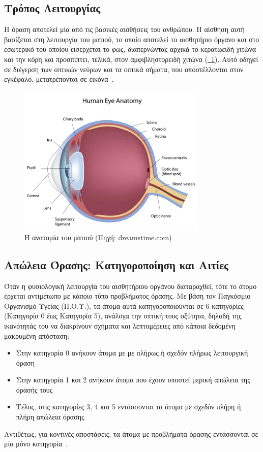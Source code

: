 \subsection{Τρόπος Λειτουργίας}\label{subsec:visionDefinition}
Η όραση αποτελεί μία από τις βασικές αισθήσεις του ανθρώπου. Η αίσθηση αυτή βασίζεται στη λειτουργία του ματιού, το οποίο αποτελεί το αισθητήριο όργανο και στο εσωτερικό του οποίου εισερχεται το φως, διαπερνώντας αρχικά το κερατωειδή χιτώνα και την κόρη και προσπίπτει, τελικά, στον αμφιβληστορειδή χιτώνα (\hyperref[fig:eye_anatomy]{\schema~\ref*{fig:eye_anatomy}}). Αυτό οδηγεί σε διέγερση των οπτικών νεύρων και τα οπτικά σήματα, που αποστέλλονται στον εγκέφαλο, μετατρέπονται σε εικόνα~\cite{nationaleyeinstitute_2022_how}\cite{anspaugh_2022_vision}.

\begin{figure}[!h]
  \centering
  \includegraphics[width=90mm]{images/eye_anatomy.jpg}
  \caption{Η ανατομία του ματιού {\footnotesize(Πηγή: dreamstime.com)}}\label{fig:eye_anatomy}
\end{figure}

\subsection{Απώλεια Όρασης: Κατηγοροποίηση και Αιτίες}\label{subsec:visionCauses}
Όταν η φυσιολογική λειτουργία του αισθητήριου οργάνου διαταραχθεί, τότε το άτομο έρχεται αντιμέτωπο με κάποιο τύπο προβλήματος όρασης. Με βάση τον Παγκόσμιο Οργανισμό Υγείας (Π.Ο.Υ.), τα άτομα αυτά κατηγοροποιούνται σε 6 κατηγορίες (Κατηγορία 0 έως Κατηγορία 5), ανάλογα την οπτική τους οξύτητα, δηλαδή της ικανότητάς του να διακρίνουν σχήματα και λεπτομέρειες από κάποια δεδομένη μακρυμένη απόσταση:
\begin{itemize}
    \item Στην κατηγορία 0 ανήκουν άτομα με με πλήρως ή σχεδόν πλήρως λειτουργική όραση
    \item Στην κατηγορία 1 και 2 ανήκουν άτομα που έχουν υποστεί μερική απώλεια της όρασής τους
    \item Τέλος, στις κατηγορίες 3, 4 και 5 εντάσσονται τα άτομα με σχεδόν πλήρη ή πλήρη απώλεια όρασης
\end{itemize}
Αντιθέτως, για κοντινές αποστάσεις, τα άτομα με προβλήματα όρασης εντάσσονται σε μία μόνο κατηγορία~\cite{worldhealthorganization_2019_world}.

